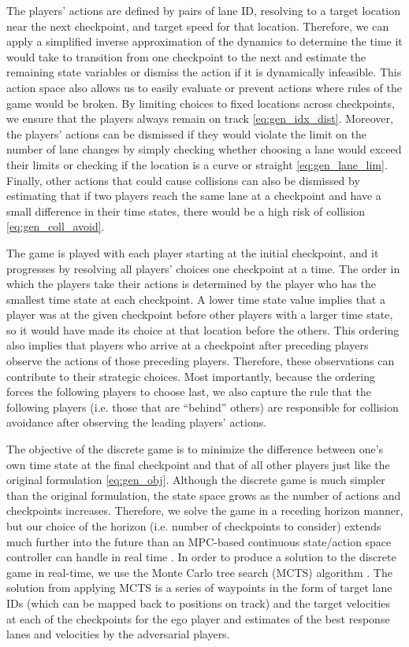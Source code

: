 The players' actions are defined by pairs of lane ID, resolving to a target location near the next checkpoint, and target speed for that location. Therefore, we can apply a simplified inverse approximation of the dynamics to determine the time it would take to transition from one checkpoint to the next and estimate the remaining state variables or dismiss the action if it is dynamically infeasible. This action space also allows us to easily evaluate or prevent actions where rules of the game would be broken. By limiting choices to fixed locations across checkpoints, we ensure that the players always remain on track \eqref{eq:gen_idx_dist}. Moreover, the players' actions can be dismissed if they would violate the limit on the number of lane changes by simply checking whether choosing a lane would exceed their limits or checking if the location is a curve or straight \eqref{eq:gen_lane_lim}. Finally, other actions that could cause collisions can also be dismissed by estimating that if two players reach the same lane at a checkpoint and have a small difference in their time states, there would be a high risk of collision \eqref{eq:gen_coll_avoid}.

The game is played with each player starting at the initial checkpoint, and it progresses by resolving all players' choices one checkpoint at a time. The order in which the players take their actions is determined by the player who has the smallest time state at each checkpoint. A lower time state value implies that a player was at the given checkpoint before other players with a larger time state, so it would have made its choice at that location before the others. This ordering also implies that players who arrive at a checkpoint after preceding players observe the actions of those preceding players. Therefore, these observations can contribute to their strategic choices. Most importantly, because the ordering forces the following players to choose last, we also capture the rule that the following players (i.e. those that are ``behind'' others) are responsible for collision avoidance after observing the leading players' actions. 

The objective of the discrete game is to minimize the difference between one's own time state at the final checkpoint and that of all other players just like the original formulation \eqref{eq:gen_obj}. Although the discrete game is much simpler than the original formulation, the state space grows as the number of actions and checkpoints increases. Therefore, we solve the game in a receding horizon manner, but our choice of the horizon (i.e. number of checkpoints to consider) extends much further into the future than an MPC-based continuous state/action space controller can handle in real time \cite{wang2019game}. In order to produce a solution to the discrete game in real-time, we use the Monte Carlo tree search (MCTS) algorithm \cite{mcts}. The solution from applying MCTS is a series of waypoints in the form of target lane IDs (which can be mapped back to positions on track) and the target velocities at each of the checkpoints for the ego player and estimates of the best response lanes and velocities by the adversarial players. 

